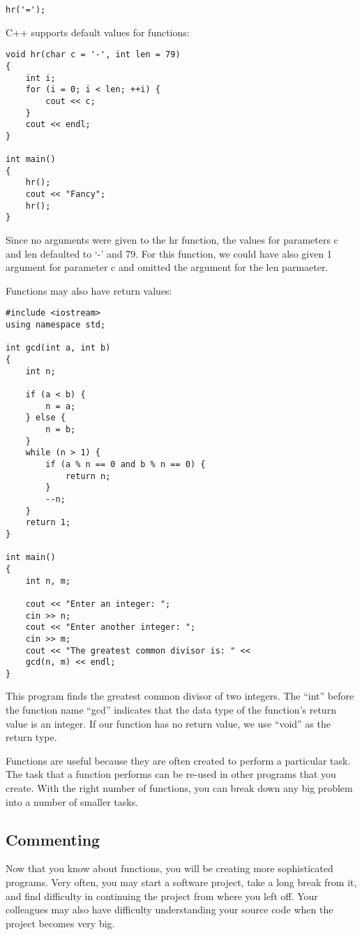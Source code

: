 \documentclass[a4paper,12pt]{article}
\begin{document}
\begin{lstlisting}
hr('=');
\end{lstlisting}

C++ supports default values for functions:

\begin{lstlisting}
void hr(char c = '-', int len = 79)
{
	int i;
	for (i = 0; i < len; ++i) {
		cout << c;
	}
	cout << endl;
}

int main()
{
	hr();
	cout << "Fancy";
	hr();
}
\end{lstlisting}

Since no arguments were given to the hr function, the values for parameters c and len defaulted to `-' and 79. For this function, we could have also given 1 argument for parameter c and omitted the argument for the len parmaeter.

Functions may also have return values:

\begin{lstlisting}[caption=gcd.cpp]
#include <iostream>
using namespace std;

int gcd(int a, int b)
{
	int n;

	if (a < b) {
		n = a;
	} else {
		n = b;
	}
	while (n > 1) {
		if (a % n == 0 and b % n == 0) {
			return n;
		}
		--n;
	}
	return 1;
}

int main()
{
	int n, m;

	cout << "Enter an integer: ";
	cin >> n;
	cout << "Enter another integer: ";
	cin >> m;
	cout << "The greatest common divisor is: " <<
	gcd(n, m) << endl;
}
\end{lstlisting}
This program finds the greatest common divisor of two integers. The ``int'' before the function name ``gcd'' indicates that the data type of the function's return value is an integer. If our function has no return value, we use ``void'' as the return type.

Functions are useful because they are often created to perform a particular task. The task that a function performs can be re-used in other programs that you create. With the right number of functions, you can break down any big problem into a number of smaller tasks.

\subsection*{Commenting}

Now that you know about functions, you will be creating more sophisticated programs. Very often, you may start a software project, take a long break from it, and find difficulty in continuing the project from where you left off. Your colleagues may also have difficulty understanding your source code when the project becomes very big. 
\end{document}
